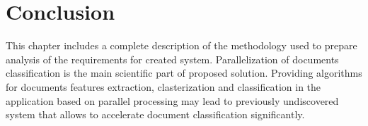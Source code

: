 \section{Conclusion}
This chapter includes a complete description of the methodology used to prepare analysis of the requirements for created system. Parallelization of documents classification is the main scientific part of proposed solution. Providing algorithms for documents features extraction, clasterization and classification in the application based on parallel processing may lead to previously undiscovered system that allows to accelerate document classification significantly. 